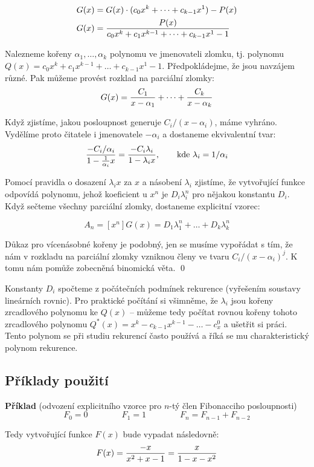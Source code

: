 \begin{align}
G(x) &= G(x)\cdot(c_0x^k + \dots + c_{k-1}x^1) - P(x) \\
G(x) &= {P(x)\over c_0x^k+c_1x^{k-1}+\dots +c_{k-1}x^1-1}
\end{align}

Nalezneme kořeny $\alpha_1, \dots, \alpha_k$ polynomu ve jmenovateli zlomku,
tj. polynomu $Q(x) = c_0x^k+c_1x^{k-1}+\dots +c_{k-1}x^1-1$. Předpokládejme,
že jsou navzájem různé. Pak můžeme provést rozklad na parciální zlomky:
$$G(x) = {C_1\over x-\alpha_1} + \dots + {C_k\over x-\alpha_k}$$

Když zjistíme, jakou posloupnost generuje $C_i/(x-\alpha_i)$, máme
vyhráno. Vydělíme proto čitatele i jmenovatele $-\alpha_i$ a dostaneme
ekvivalentní tvar:
$${-C_i/\alpha_i\over1-{1\over\alpha_i}x} = {-C_i\lambda_i\over 1-\lambda_ix},\qquad\text{kde}~\lambda_i = 1/\alpha_i$$

Pomocí pravidla o dosazení $\lambda_ix$ za $x$ a násobení $\lambda_i$
zjistíme, že vytvořující funkce odpovídá polynomu, jehož koeficient u $x^n$
je $D_i\lambda_i^n$ pro nějakou konstantu $D_i$. Když sečteme všechny parciální zlomky, dostaneme explicitní vzorec:

$$A_n = [x^n]G(x) = D_1\lambda_1^n + \dots + D_k\lambda_k^n$$

Důkaz pro vícenásobné kořeny je podobný, jen se musíme vypořádat s tím, že nám v rozkladu na parciální zlomky vzniknou členy ve tvaru $C_i/(x-\alpha_i)^j$. K tomu nám pomůže zobecněná binomická věta.
\qed

Konstanty $D_i$ spočteme z počátečních podmínek rekurence (vyřešením soustavy lineárních rovnic). Pro praktické počítání si všimněme, že $\lambda_i$ jsou kořeny zrcadlového polynomu ke $Q(x)$ -- můžeme tedy počítat rovnou kořeny tohoto zrcadlového polynomu $Q^*(x) = x^k-c_{k-1}x^{k-1}-\dots-c_x^0$ a ušetřit si práci. Tento polynom se při studiu rekurencí často používá a říká se mu charakteristický polynom rekurence.

\subsection{Příklady použití}
\noindent\textbf{Příklad} (odvození explicitního vzorce pro $n$-tý člen Fibonacciho posloupnosti)
$$F_0 = 0\qquad\qquad F_1 = 1\qquad\qquad F_n = F_{n-1} + F_{n-2}$$

Tedy vytvořující funkce $F(x)$ bude vypadat následovně:
$$F(x) = {-x\over x^2+x-1} = {x\over 1-x-x^2}$$

